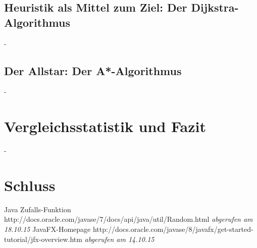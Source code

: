 \documentclass[12pt]{article}
\begin{document}
\subsection{Heuristik als Mittel zum Ziel: Der Dijkstra-Algorithmus}
\newpage
-
\newpage

\subsection{Der Allstar: Der A*-Algorithmus}
\newpage
-
\newpage

\section{Vergleichsstatistik und Fazit}
\newpage
-
\newpage

\section{Schluss}
\newpage

\begin{thebibliography}{9}
 Java Zufalls-Funktion http://docs.oracle.com/javase/7/docs/api/java/util/Random.html \emph{abgerufen am 18.10.15}
 JavaFX-Homepage http://docs.oracle.com/javase/8/javafx/get-started-tutorial/jfx-overview.htm \emph{abgerufen am 14.10.15}
\end{thebibliography}
\end{document}
